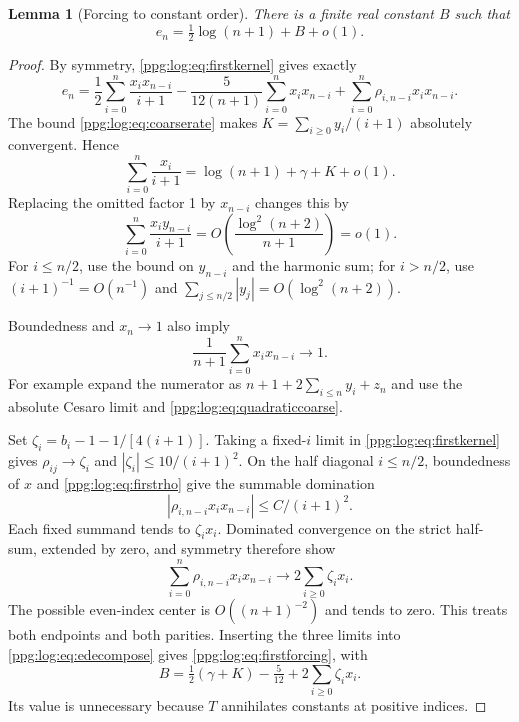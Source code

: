 \documentclass[11pt,letterpaper]{article}
\newtheorem{lemma}[theorem]{Lemma}
\theoremstyle{remark}\newtheorem{remark}[theorem]{Remark}
\numberwithin{equation}{section}
\begin{document}
\begin{lemma}[Forcing to constant order]\label{ppg:log:lem:firstforcing}
There is a finite real constant $B$ such that
\begin{equation}\label{ppg:log:eq:firstforcing}
 e_n=\tfrac12\log(n+1)+B+o(1).
\end{equation}
\end{lemma}
\begin{proof}
By symmetry, \eqref{ppg:log:eq:firstkernel} gives exactly
\begin{equation}\label{ppg:log:eq:edecompose}
 e_n=\frac12\sum_{i=0}^n\frac{x_ix_{n-i}}{i+1}
    -\frac5{12(n+1)}\sum_{i=0}^nx_ix_{n-i}
    +\sum_{i=0}^n\rho_{i,n-i}x_ix_{n-i}.
\end{equation}
The bound \eqref{ppg:log:eq:coarserate} makes $K=\sum_{i\ge0}y_i/(i+1)$ absolutely convergent. Hence
\[
 \sum_{i=0}^n\frac{x_i}{i+1}=\log(n+1)+\gamma+K+o(1).
\]
Replacing the omitted factor 1 by $x_{n-i}$ changes this by
\[
 \sum_{i=0}^n\frac{x_iy_{n-i}}{i+1}
 =O\!\left(\frac{\log^2(n+2)}{n+1}\right)=o(1).
\]
For $i\le n/2$, use the bound on $y_{n-i}$ and the harmonic sum; for $i>n/2$, use $(i+1)^{-1}=O(n^{-1})$ and $\sum_{j\le n/2}|y_j|=O(\log^2(n+2))$.

Boundedness and $x_n\to1$ also imply
\[
 \frac1{n+1}\sum_{i=0}^nx_ix_{n-i}\longrightarrow1.
\]
For example expand the numerator as $n+1+2\sum_{i\le n}y_i+z_n$ and use the absolute Cesaro limit and \eqref{ppg:log:eq:quadraticcoarse}.

Set $\zeta_i=b_i-1-1/[4(i+1)]$. Taking a fixed-$i$ limit in \eqref{ppg:log:eq:firstkernel} gives $\rho_{ij}\to\zeta_i$ and $|\zeta_i|\le10/(i+1)^2$. On the half diagonal $i\le n/2$, boundedness of $x$ and \eqref{ppg:log:eq:firstrho} give the summable domination
\[
 |\rho_{i,n-i}x_ix_{n-i}|\le C/(i+1)^2.
\]
Each fixed summand tends to $\zeta_ix_i$. Dominated convergence on the strict half-sum, extended by zero, and symmetry therefore show
\[
 \sum_{i=0}^n\rho_{i,n-i}x_ix_{n-i}\longrightarrow2\sum_{i\ge0}\zeta_ix_i.
\]
The possible even-index center is $O((n+1)^{-2})$ and tends to zero. This treats both endpoints and both parities. Inserting the three limits into \eqref{ppg:log:eq:edecompose} gives \eqref{ppg:log:eq:firstforcing}, with
\begin{equation}\label{ppg:log:eq:B}
 B=\tfrac12(\gamma+K)-\tfrac5{12}+2\sum_{i\ge0}\zeta_ix_i.
\end{equation}
Its value is unnecessary because $T$ annihilates constants at positive indices.
\end{proof}
\end{document}

